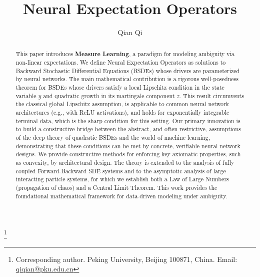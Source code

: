 \documentclass[qian]{imsart}
\theoremstyle{plain}
\theoremstyle{definition}
\begin{document}
\begin{frontmatter}

\title{Neural Expectation Operators}
\author{Qian Qi}
\thanks{Corresponding author. Peking University, Beijing 100871, China. Email: \href{mailto:qiqian@pku.edu.cn}{qiqian@pku.edu.cn}}

\begin{abstract}
This paper introduces \textbf{Measure Learning}, a paradigm for modeling ambiguity via non-linear expectations. We define Neural Expectation Operators as solutions to Backward Stochastic Differential Equations (BSDEs) whose drivers are parameterized by neural networks. The main mathematical contribution is a rigorous well-posedness theorem for BSDEs whose drivers satisfy a local Lipschitz condition in the state variable $y$ and quadratic growth in its martingale component $z$. This result circumvents the classical global Lipschitz assumption, is applicable to common neural network architectures (e.g., with ReLU activations), and holds for exponentially integrable terminal data, which is the sharp condition for this setting. Our primary innovation is to build a constructive bridge between the abstract, and often restrictive, assumptions of the deep theory of quadratic BSDEs and the world of machine learning, demonstrating that these conditions can be met by concrete, verifiable neural network designs. We provide constructive methods for enforcing key axiomatic properties, such as convexity, by architectural design. The theory is extended to the analysis of fully coupled Forward-Backward SDE systems and to the asymptotic analysis of large interacting particle systems, for which we establish both a Law of Large Numbers (propagation of chaos) and a Central Limit Theorem. This work provides the foundational mathematical framework for data-driven modeling under ambiguity.
\end{abstract}

\begin{keyword}[class=MSC2020]
\end{keyword}

\begin{keyword}
\end{keyword}
\end{frontmatter}
\end{document}

